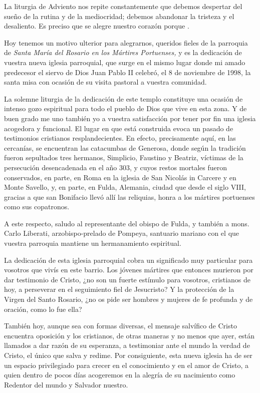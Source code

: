 \begin{body}
\begin{body}
La liturgia de Adviento nos repite constantemente que debemos despertar del sueño de la rutina y de la mediocridad; debemos abandonar la tristeza y el desaliento. Es preciso que se alegre nuestro corazón porque .

Hoy tenemos un motivo ulterior para alegrarnos, queridos fieles de la parroquia de \emph{Santa María del Rosario en los Mártires Portuenses,} y es la dedicación de vuestra nueva iglesia parroquial, que surge en el mismo lugar donde mi amado predecesor el siervo de Dios Juan Pablo II celebró, el 8 de noviembre de 1998, la santa misa con ocasión de su visita pastoral a vuestra comunidad.

La solemne liturgia de la dedicación de este templo constituye una ocasión de intenso gozo espiritual para todo el pueblo de Dios que vive en esta zona. Y de buen grado me uno también yo a vuestra satisfacción por tener por fin una iglesia acogedora y funcional. El lugar en que está construida evoca un pasado de testimonios cristianos resplandecientes. En efecto, precisamente aquí, en las cercanías, se encuentran las catacumbas de Generosa, donde según la tradición fueron sepultados tres hermanos, Simplicio, Faustino y Beatriz, víctimas de la persecución desencadenada en el año 303, y cuyos restos mortales fueron conservados, en parte, en Roma en la iglesia de San Nicolás in Carcere y en Monte Savello, y, en parte, en Fulda, Alemania, ciudad que desde el siglo VIII, gracias a que san Bonifacio llevó allí las reliquias, honra a los mártires portuenses como sus copatronos.

A este respecto, saludo al representante del obispo de Fulda, y también a mons. Carlo Liberati, arzobispo-prelado de Pompeya, santuario mariano con el que vuestra parroquia mantiene un hermanamiento espiritual.

La dedicación de esta iglesia parroquial cobra un significado muy particular para vosotros que vivís en este barrio. Los jóvenes mártires que entonces murieron por dar testimonio de Cristo, ¿no son un fuerte estímulo para vosotros, cristianos de hoy, a perseverar en el seguimiento fiel de Jesucristo? Y la protección de la Virgen del Santo Rosario, ¿no os pide ser hombres y mujeres de fe profunda y de oración, como lo fue ella?

También hoy, aunque sea con formas diversas, el mensaje salvífico de Cristo encuentra oposición y los cristianos, de otras maneras y no menos que ayer, están llamados a dar razón de su esperanza, a testimoniar ante el mundo la verdad de Cristo, el único que salva y redime. Por consiguiente, esta nueva iglesia ha de ser un espacio privilegiado para crecer en el conocimiento y en el amor de Cristo, a quien dentro de pocos días acogeremos en la alegría de su nacimiento como Redentor del mundo y Salvador nuestro.


\end{body}
\end{body}
